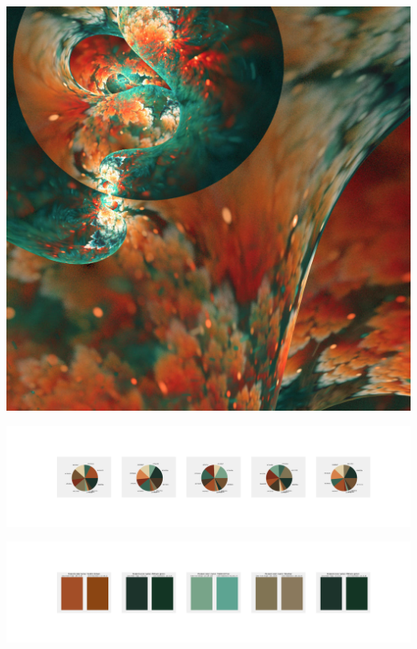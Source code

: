 \documentclass[11pt]{article}
\begin{document}
\begin{landscape}
    \begin{center}
    \includegraphics[width=\textwidth]{./nbimg/file (384).jpg}
    \end{center}

    \begin{center}
    \includegraphics[width=250mm]{./nbimg/pie-316.jpg}
    \end{center}

    \begin{center}
    \includegraphics[width=250mm]{./nbimg/peak-316.jpg}
    \end{center}
    


\end{landscape}
\end{document}
